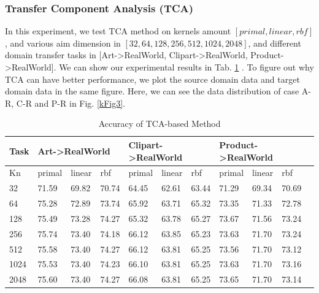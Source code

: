 \documentclass[conference]{IEEEtran}
\begin{document}
\subsubsection{Transfer Component Analysis (TCA)}

In this experiment, we test TCA method on kernels amount $[primal, linear, rbf]$, and various aim dimension in $[32,64,128,256,512,1024,2048]$, and different domain transfer tasks in [Art->RealWorld, Clipart->RealWorld, Product->RealWorld]. We can show our experimental results in Tab. \ref{kbase1} . To figure out why TCA can have better performance, we plot the source domain data and target domain data in the same figure. Here, we can see the data distribution of case A-R, C-R and P-R in Fig. \ref{kFig3}.

\begin{table}[htbp]
\caption{Accuracy of TCA-based Method}
\label{kbase1}%
\begin{tabular}{@{}p{0.3cm}<{\centering}|l|l|l|l|l|l|l|l|l|l|}
\hline
Task & \multicolumn{3}{l|}{Art-\textgreater{}RealWorld} & \multicolumn{3}{l|}{Clipart-\textgreater{}RealWorld} & \multicolumn{3}{l|}{Product-\textgreater{}RealWorld} \\ \hline
Kn   & primal          & linear         & rbf           & primal           & linear           & rbf            & primal           & linear           & rbf            \\ \hline
32       & 71.59           & 69.82          & 70.74         & 64.45            & 62.61            & 63.44          & 71.29            & 69.34            & 70.69          \\ \hline
64       & 75.28           & 72.89          & 73.74         & 65.92            & 63.71            & 65.32          & 73.35            & 71.33            & 72.78          \\ \hline
128      & 75.49           & 73.28          & 74.27         & 65.32            & 63.78            & 65.27          & 73.67            & 71.56            & 73.24          \\ \hline
256      & 75.74           & 73.40          & 74.18         & 66.12            & 63.85            & 65.23          & 73.63            & 71.70            & 73.24          \\ \hline
512      & 75.58           & 73.40          & 74.27         & 66.12            & 63.81            & 65.25          & 73.56            & 71.70            & 73.12          \\ \hline
1024     & 75.53           & 73.40          & 74.23         & 66.10            & 63.81            & 65.25          & 73.63            & 71.70            & 73.16          \\ \hline
2048     & 75.60           & 73.40          & 74.27         & 66.08            & 63.81            & 65.25          & 73.65            & 71.70            & 73.14          \\ \hline
\end{tabular}
\end{table}
\end{document}
